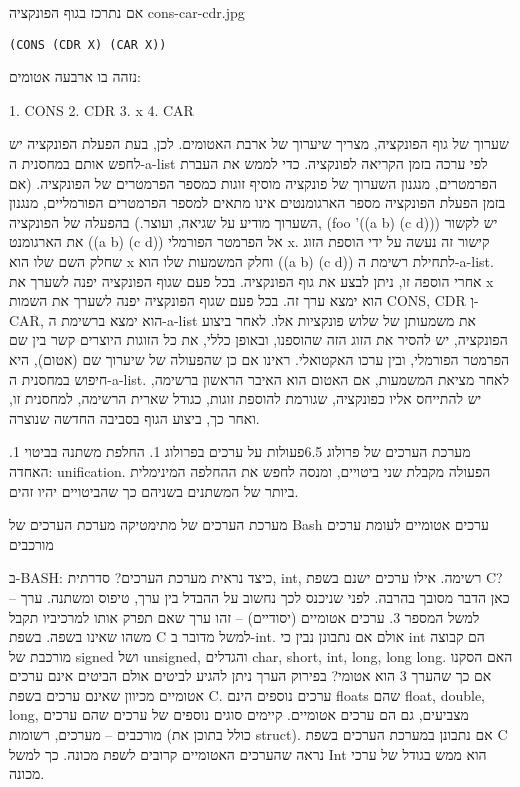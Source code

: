       אם נתרכז בגוף הפונקציה
      cons-car-cdr.jpg

\begin{verbatim}
(CONS (CDR X) (CAR X))
\end{verbatim}
      נזהה בו ארבעה אטומים:
\begin{LISP}
                                 1. CONS
                                 2. CDR
                                 3. x
                                 4. CAR
\end{LISP}
      שערוך של גוף הפונקציה, מצריך שיערוך של ארבת האטומים. לכן, בעת הפעלת הפונקציה יש לחפש אותם במחסנית ה-a-list לפי ערכה בזמן הקריאה לפונקציה. כדי לממש את העברת הפרמטרים, מנגנון השערוך של פונקציה מוסיף זוגות כמספר הפרמטרים של הפונקציה. (אם בזמן הפעלת הפונקציה מספר הארגומנטים אינו מתאים למספר הפרמטרים הפורמליים, מנגנון השערוך מודיע על שגיאה, ועוצר.)
      בהפעלה של הפונקציה,
      (foo '((a b) (c d)))
      יש לקשור את הארגומנט ((a b) (c d)) אל הפרמטר הפורמלי x. קישור זה נעשה על ידי הוספת הזוג שחלק השם שלו הוא x וחלק המשמעות שלו הוא ((a b) (c d)) לתחילת רשימת ה-a-list. אחרי הוספה זו, ניתן לבצע את גוף הפונקציה. בכל פעם שגוף הפונקציה יפנה לשערך את x הוא ימצא ערך זה. בכל פעם שגוף הפונקציה יפנה לשערך את השמות CONS, CDR וְ-CAR, הוא ימצא ברשימת ה-a-list את משמעותן של שלוש פונקציות אלו. לאחר ביצוע הפונקציה, יש להסיר את הזוג הזה שהוספנו, ובאופן כללי, את כל הזוגות היוצרים קשר בין שם הפרמטר הפורמלי, ובין ערכו האקטואלי.
      ראינו אם כן שהפעולה של שיערוך שם (אטום), היא חיפוש במחסנית ה-a-list. לאחר מציאת המשמעות, אם האטום הוא האיבר הראשון ברשימה, יש להתייחס אליו כפונקציה, שגורמת להוספת זוגות, כגודל שארית הרשימה, למחסנית זו, ואחר כך, ביצוע הגוף בסביבה החדשה שנוצרה.

      מערכת הערכים של פרולוג
      6.5פעולות על ערכים בפרולוג
      1. החלפת משתנה בביטוי
      1. האחדה: unification. הפעולה מקבלת שני ביטויים, ומנסה לחפש את ההחלפה המינימלית ביותר של המשתנים בשניהם כך שהביטויים יהיו זהים.

      מערכת הערכים של מתימטיקה
      מערכת הערכים של Bash
      ערכים אטומיים לעומת ערכים מורכבים

      ב-BASH: כיצד נראית מערכת הערכים?
      סדרתית, int, רשימה.
      אילו ערכים ישנם בשפת C?
      כאן הדבר מסובך בהרבה. לפני שניכנס לכך נחשוב על ההבדל בין ערך, טיפוס ומשתנה.
      ערך – למשל המספר 3. ערכים אטומיים (יסודיים) – זהו ערך שאם תפרק אותו למרכיביו תקבל משהו שאינו בשפה. בשפת C למשל מדובר ב-int. אולם אם נתבונן נבין כי int הם קבוצה מורכבת של signed ושל unsigned, והגדלים char, short, int, long, long long.
      האם הסקנו אם כך שהערך 3 הוא אטומי? בפירוק הערך ניתן להגיע לביטים אולם הביטים אינם ערכים אטומיים מכיוון שאינם ערכים בשפת C.
      ערכים נוספים הינם floats שהם float, double, long, מצביעים, גם הם ערכים אטומיים.
      קיימים סוגים נוספים של ערכים שהם ערכים מורכבים – מערכים, רשומות (כולל בתוכן את struct).
      אם נתבונן במערכת הערכים בשפת C נראה שהערכים האטומיים קרובים לשפת מכונה. כך למשל Int הוא ממש בגודל של ערכי מכונה.

